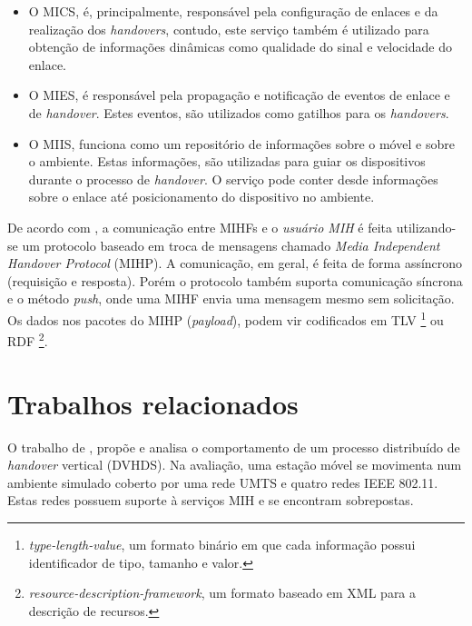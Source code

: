 \documentclass[12pt]{article}
\begin{document}
\begin{itemize}

	\item O MICS, é, principalmente, responsável pela configuração de enlaces 
		e da realização dos \textit{handovers}, contudo, este serviço também é 
		utilizado para obtenção de informações dinâmicas como qualidade do 
		sinal e velocidade do enlace.

	\item O MIES, é responsável pela propagação e notificação de eventos de enlace 
		e de \textit{handover}. Estes eventos, são utilizados como gatilhos para 
		os \textit{handovers}.

	\item O MIIS, funciona como um repositório de informações sobre o móvel e 
		sobre o ambiente.  Estas informações, são utilizadas para guiar os 
		dispositivos durante o processo de \textit{handover}. O serviço pode 
		conter desde informações sobre o enlace até posicionamento do dispositivo 
		no ambiente.
	
\end{itemize}

De acordo com \cite{ieee:2008:80221}, a comunicação entre MIHFs e o 
\textit{usuário MIH} é feita utilizando-se um protocolo baseado em troca de 
mensagens chamado \textit{Media Independent Handover Protocol} (MIHP).  A 
comunicação, em geral, é feita de forma assíncrono (requisição e resposta). 
Porém o protocolo também suporta comunicação síncrona e o método 
\textit{push}, onde uma MIHF envia uma mensagem mesmo sem solicitação.  Os 
dados nos pacotes do MIHP (\textit{payload}), podem vir codificados em  TLV  
\footnote{\textit{type-length-value}, um formato binário em que cada 
informação possui identificador de tipo, tamanho e valor.} ou RDF 
\footnote{\textit{resource-description-framework}, um formato baseado em XML 
para a descrição de recursos.}.

\section{Trabalhos relacionados} \label{sec:trabalhos} %

O trabalho de \cite{tawil:2008}, propõe e analisa o comportamento de um 
processo distribuído de \textit{handover} vertical (DVHDS). Na avaliação, uma 
estação móvel se movimenta num ambiente simulado coberto por uma rede UMTS e 
quatro redes IEEE 802.11. Estas redes possuem suporte à serviços MIH e se 
encontram sobrepostas.
\end{document}
